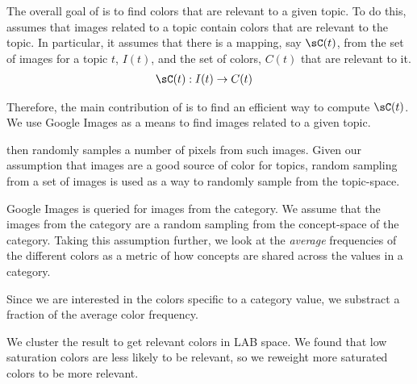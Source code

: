 The overall goal of \system is to find colors that are relevant to a given topic. To do this, \system assumes that images related to a topic contain colors that are relevant to the topic. In particular, it assumes that there is a mapping, say $\sC(t)$, from the set of images for a topic $t$, $I(t)$, and the set of colors, $C(t)$ that are relevant to it. 
\begin{align*}
\sC(t) : I(t) &\rightarrow C(t)
\end{align*} 

Therefore, the main contribution of \system is to find an efficient way to compute $\sC(t)$. 
We use Google Images as a means to find images related to a given topic. 

\system then randomly samples a number of pixels from such images. Given our assumption that images are a good source of color for topics, random sampling from a set of images is used as a way to randomly sample from the topic-space.   

Google Images is queried for images from  the category.
We assume that the images from the category are a random sampling from the concept-space of the category. Taking this assumption further, we look at the {\em average} frequencies of the different colors as a metric of how concepts are shared across the values in a category.



Since we are interested in the colors specific to a category value, we substract a fraction of the average color frequency. 

We cluster the result to get relevant colors in LAB space. We found that low saturation colors are less likely to be relevant, 
so we reweight more saturated colors to be more relevant.
